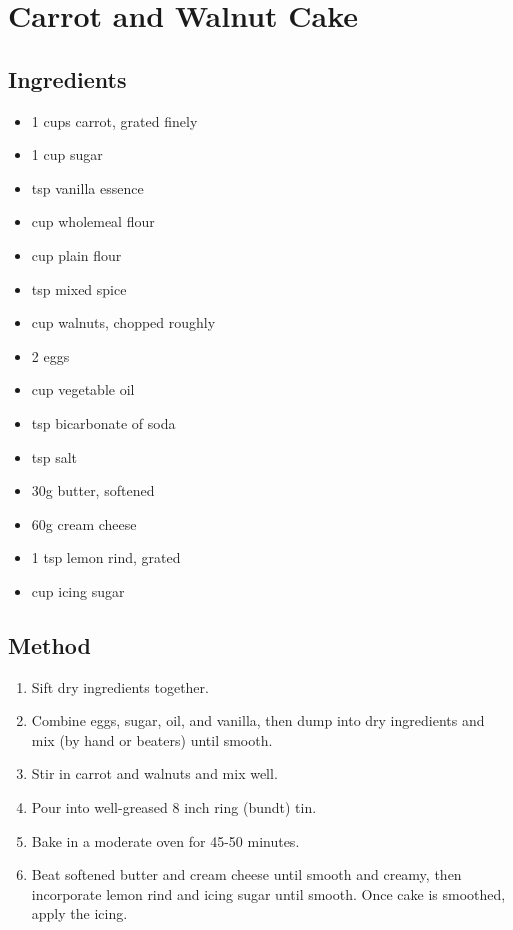 \clearpage
\section{Carrot and Walnut Cake}


\subsection{Ingredients}

\begin{itemize}
    \item 1 cups carrot, grated finely
    \item 1 cup sugar
    \item {} tsp vanilla essence
    \item {} cup wholemeal flour
    \item {} cup plain flour
    \item {} tsp mixed spice
    \item {} cup walnuts, chopped roughly
    \item 2 eggs
    \item {} cup vegetable oil
    \item {} tsp bicarbonate of soda
    \item {} tsp salt
    \item 30g butter, softened
    \item 60g cream cheese
    \item 1 tsp lemon rind, grated
    \item {} cup icing sugar
\end{itemize}

\subsection{Method}

\begin{enumerate}
    \item Sift dry ingredients together.
    \item Combine eggs, sugar, oil, and vanilla, then dump into dry ingredients and mix (by hand or beaters) until smooth.
    \item Stir in carrot and walnuts and mix well.
    \item Pour into well-greased 8 inch ring (bundt) tin.
    \item Bake in a moderate oven for 45-50 minutes.
    \item Beat softened butter and cream cheese until smooth and creamy, then incorporate lemon rind and icing sugar until smooth. Once cake is smoothed, apply the icing.
\end{enumerate}
